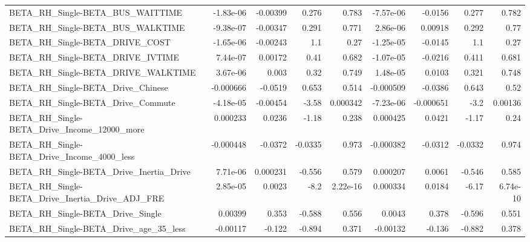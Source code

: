 \begin{tabular}{lrrrrrrrr}
BETA\_RH\_Single-BETA\_BUS\_WAITTIME                   &   -1.83e-06 &     -0.00399 &    0.276 &    0.783 &  -7.57e-06 &     -0.0156 &        0.277 &         0.782 \\
BETA\_RH\_Single-BETA\_BUS\_WALKTIME                   &   -9.38e-07 &     -0.00347 &    0.291 &    0.771 &   2.86e-06 &     0.00918 &        0.292 &          0.77 \\
BETA\_RH\_Single-BETA\_DRIVE\_COST                     &   -1.65e-06 &     -0.00243 &      1.1 &     0.27 &  -1.25e-05 &     -0.0145 &          1.1 &          0.27 \\
BETA\_RH\_Single-BETA\_DRIVE\_IVTIME                   &    7.44e-07 &      0.00172 &     0.41 &    0.682 &  -1.07e-05 &     -0.0216 &        0.411 &         0.681 \\
BETA\_RH\_Single-BETA\_DRIVE\_WALKTIME                 &    3.67e-06 &        0.003 &     0.32 &    0.749 &   1.48e-05 &      0.0103 &        0.321 &         0.748 \\
BETA\_RH\_Single-BETA\_Drive\_Chinese                  &   -0.000666 &      -0.0519 &    0.653 &    0.514 &  -0.000509 &     -0.0386 &        0.643 &          0.52 \\
BETA\_RH\_Single-BETA\_Drive\_Commute                  &   -4.18e-05 &     -0.00454 &    -3.58 & 0.000342 &  -7.23e-06 &   -0.000651 &         -3.2 &       0.00136 \\
BETA\_RH\_Single-BETA\_Drive\_Income\_12000\_more        &    0.000233 &       0.0236 &    -1.18 &    0.238 &   0.000425 &      0.0421 &        -1.17 &          0.24 \\
BETA\_RH\_Single-BETA\_Drive\_Income\_4000\_less         &   -0.000448 &      -0.0372 &  -0.0335 &    0.973 &  -0.000382 &     -0.0312 &      -0.0332 &         0.974 \\
BETA\_RH\_Single-BETA\_Drive\_Inertia\_Drive            &    7.71e-06 &     0.000231 &   -0.556 &    0.579 &   0.000207 &      0.0061 &       -0.546 &         0.585 \\
BETA\_RH\_Single-BETA\_Drive\_Inertia\_Drive\_ADJ\_FRE    &    2.85e-05 &       0.0023 &     -8.2 & 2.22e-16 &   0.000334 &      0.0184 &        -6.17 &      6.74e-10 \\
BETA\_RH\_Single-BETA\_Drive\_Single                   &     0.00399 &        0.353 &   -0.588 &    0.556 &     0.0043 &       0.378 &       -0.596 &         0.551 \\
BETA\_RH\_Single-BETA\_Drive\_age\_35\_less              &    -0.00117 &       -0.122 &   -0.894 &    0.371 &   -0.00132 &      -0.136 &       -0.882 &         0.378 \\

\end{tabular}
